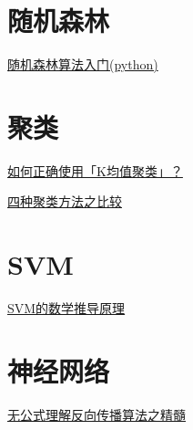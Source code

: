 \documentclass[
]{book}
\begin{document}
\hypertarget{ux968fux673aux68eeux6797}{%
\section{随机森林}\label{ux968fux673aux68eeux6797}}

\href{https://mp.weixin.qq.com/s?__biz=MzA4MjYwMTc5Nw==\&mid=2648929705\&idx=1\&sn=c3ab83bdb048c595277fe2d1885a2a8c\&chksm=8794e783b0e36e956262065dda46cc0626829efb40ef66fcf0e31b34ed9f93b1188f05465502\&token=2004915986\&lang=en_US\#rd}{随机森林算法入门(python)}

\hypertarget{ux805aux7c7b}{%
\section{聚类}\label{ux805aux7c7b}}

\href{https://mp.weixin.qq.com/s?__biz=MzA4MjYwMTc5Nw==\&mid=2648929684\&idx=1\&sn=7099ebc2af8f0fe3f915934a9d7ac4b4\&chksm=8794e7beb0e36ea8740fcf1ed5c4081c945b98cbec109c6f7af65235657b78975c3edc8a041d\&token=2004915986\&lang=en_US\#rd}{如何正确使用「K均值聚类」？}

\href{https://mp.weixin.qq.com/s?__biz=MzA4MjYwMTc5Nw==\&mid=2648929706\&idx=2\&sn=caeb2d691717b77c2973836307346ec5\&chksm=8794e780b0e36e960013c3b19558d86a1eae1004f2616b25b03a63bc61f54709cb70f6041634\&token=2004915986\&lang=en_US\#rd}{四种聚类方法之比较}

\hypertarget{svm}{%
\section{SVM}\label{svm}}

\href{https://mp.weixin.qq.com/s?__biz=MzA4MjYwMTc5Nw==\&mid=2648929573\&idx=1\&sn=26e57d49ae4ed58bae60a6eafa3429ff\&chksm=8794e70fb0e36e19d1524331bdd6493781f1e16c15e72fde08a85ec451de95f5715cf53d44ee\&token=2004915986\&lang=en_US\#rd}{SVM的数学推导原理}

\hypertarget{ux795eux7ecfux7f51ux7edc}{%
\section{神经网络}\label{ux795eux7ecfux7f51ux7edc}}

\href{https://mp.weixin.qq.com/s?__biz=MzA4MjYwMTc5Nw==\&mid=2648931273\&idx=2\&sn=e6d3ba0ab1989daebe6a421b7203368f\&chksm=8794e9e3b0e360f50569c807473b10b1f4320020e454a1e7e7340a1301f86efb898be9d87bd9\&token=2004915986\&lang=en_US\#rd}{无公式理解反向传播算法之精髓}
\end{document}
